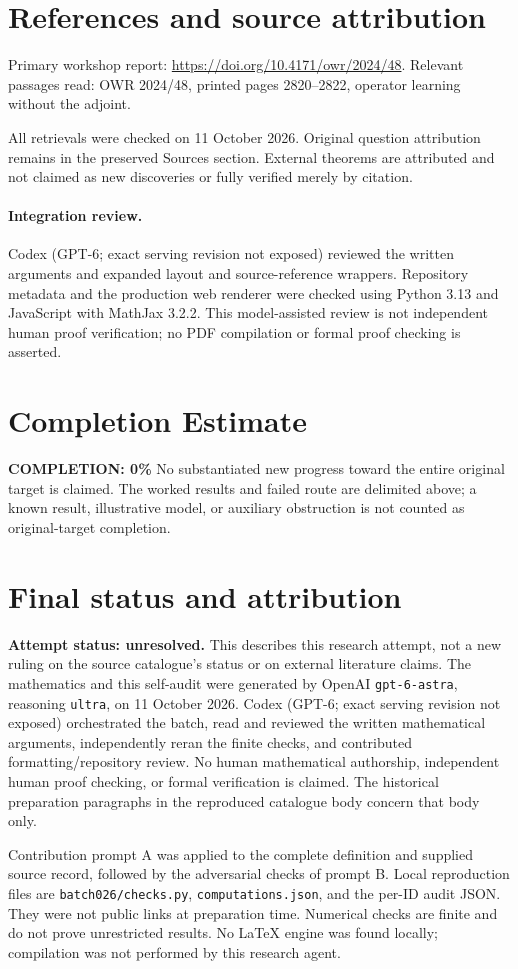 \documentclass[11pt]{article}
\begin{document}
\section{References and source attribution}
Primary workshop report: \url{https://doi.org/10.4171/owr/2024/48}. Relevant passages read: OWR 2024/48, printed pages 2820--2822, operator learning without the adjoint.

All retrievals were checked on 11 October 2026. Original question attribution remains in the preserved Sources section. External theorems are attributed and not claimed as new discoveries or fully verified merely by citation.


\paragraph{Integration review.} Codex (GPT-6; exact serving revision not exposed) reviewed the written arguments and expanded layout and source-reference wrappers. Repository metadata and the production web renderer were checked using Python 3.13 and JavaScript with MathJax 3.2.2. This model-assisted review is not independent human proof verification; no PDF compilation or formal proof checking is asserted.

\section{Completion Estimate}
\noindent\textbf{COMPLETION: 0\%}
No substantiated new progress toward the entire original target is claimed. The worked results and failed route are delimited above; a known result, illustrative model, or auxiliary obstruction is not counted as original-target completion.

\section{Final status and attribution}
\textbf{Attempt status: unresolved.} This describes this research attempt, not a new ruling on the source catalogue's status or on external literature claims.
The mathematics and this self-audit were generated by OpenAI \texttt{gpt-6-astra}, reasoning \texttt{ultra}, on 11 October 2026. Codex (GPT-6; exact serving revision not exposed) orchestrated the batch, read and reviewed the written mathematical arguments, independently reran the finite checks, and contributed formatting/repository review. No human mathematical authorship, independent human proof checking, or formal verification is claimed. The historical preparation paragraphs in the reproduced catalogue body concern that body only.

Contribution prompt A was applied to the complete definition and supplied source record, followed by the adversarial checks of prompt B. Local reproduction files are \texttt{batch026/checks.py}, \texttt{computations.json}, and the per-ID audit JSON. They were not public links at preparation time. Numerical checks are finite and do not prove unrestricted results. No LaTeX engine was found locally; compilation was not performed by this research agent.
\end{document}
